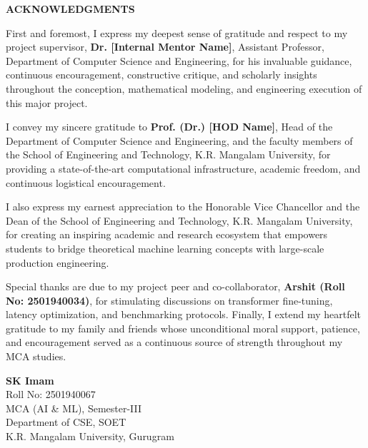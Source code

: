 \newpage
\thispagestyle{plain}
\begin{center}
    {\Large \bfseries \color{krmunavy} ACKNOWLEDGMENTS}\\[1.0cm]
\end{center}

\noindent First and foremost, I express my deepest sense of gratitude and respect to my project supervisor, \textbf{Dr. [Internal Mentor Name]}, Assistant Professor, Department of Computer Science and Engineering, for his invaluable guidance, continuous encouragement, constructive critique, and scholarly insights throughout the conception, mathematical modeling, and engineering execution of this major project.

\vspace{0.5cm}
\noindent I convey my sincere gratitude to \textbf{Prof. (Dr.) [HOD Name]}, Head of the Department of Computer Science and Engineering, and the faculty members of the School of Engineering and Technology, K.R. Mangalam University, for providing a state-of-the-art computational infrastructure, academic freedom, and continuous logistical encouragement.

\vspace{0.5cm}
\noindent I also express my earnest appreciation to the Honorable Vice Chancellor and the Dean of the School of Engineering and Technology, K.R. Mangalam University, for creating an inspiring academic and research ecosystem that empowers students to bridge theoretical machine learning concepts with large-scale production engineering.

\vspace{0.5cm}
\noindent Special thanks are due to my project peer and co-collaborator, \textbf{Arshit (Roll No: 2501940034)}, for stimulating discussions on transformer fine-tuning, latency optimization, and benchmarking protocols. Finally, I extend my heartfelt gratitude to my family and friends whose unconditional moral support, patience, and encouragement served as a continuous source of strength throughout my MCA studies.

\vspace{1.8cm}
\noindent
\begin{flushright}
    \textbf{SK Imam}\\
    Roll No: 2501940067\\
    MCA (AI \& ML), Semester-III\\
    Department of CSE, SOET\\
    K.R. Mangalam University, Gurugram
\end{flushright}

